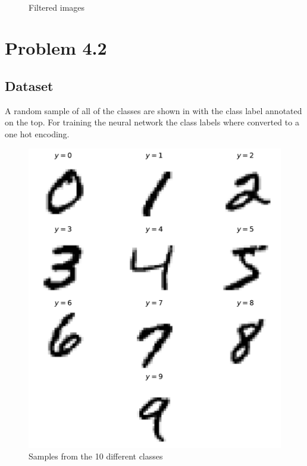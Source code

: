 \documentclass[12pt,a4paper]{scrartcl}
\begin{document}
	\begin{figure}[H]
		\centering	
		 \\
		\caption{Filtered images}
		\label{fig:ex4_1_img_filt}
	\end{figure}

\section*{Problem 4.2}
	
	\subsection*{Dataset}
	
	A random sample of all of the classes are shown in  with the class label annotated on the top.
	For training the neural network the class labels where converted to a one hot encoding.
	
	\begin{figure}[H]
		\centering
		\includegraphics[width=0.5\linewidth]{figs/ex4_2_digits}
		\caption{Samples from the 10 different classes}
		\label{fig:ex4_2_digits}
	\end{figure}
	
\end{document}
